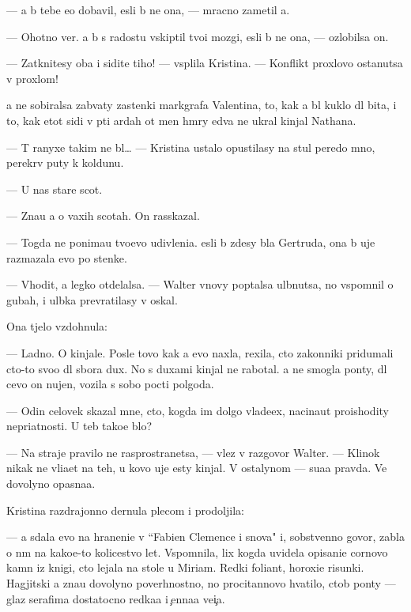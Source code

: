 \documentclass[10pt]{book}
\begin{document}
— {\Y}a b{\yi} tebe {\y}e{\x}o dobavil, {\y}esli b{\yi} ne ona, — mracno zametil {\y}a.

— Ohotno ver{\io}. {\Y}a b{\yi} s radost{\y}u vskip{\ia}til tvo{\y}i mozgi, {\y}esli b{\yi} ne ona, — ozlobilsa on.

— Zatknitesy oba i sidite tiho! — vsp{\yi}lila Kristina. — Konflikt{\yi} proxlovo ostanutsa v proxlom!

{\Y}a ne sobiralsa zab{\yi}vaty zastenki markgrafa Valentina, to, kak {\y}a b{\yi}l kuklo{\y} dl{\ia} bit{\y}a, i to, kak etot sid{\ia}{\x}i{\y} v p{\ia}ti {\y}ardah ot men{\ia} hm{\yi}ry {\y}edva ne ukral kinjal Nathana.

— T{\yi} ranyxe takim ne b{\yi}l… — Kristina ustalo opustilasy na stul peredo mno{\y}, perekr{\yi}v puty k koldunu.

— U nas star{\yi}{\y}e scot{\yi}.

— Zna{\y}u {\y}a o vaxih scotah. On rasskazal.

— Togda ne ponima{\y}u tvo{\y}evo udivleni{\y}a. {\Y}esli b{\yi} zdesy b{\yi}la Gertruda, ona b{\yi} uje razmazala {\y}evo po stenke.

— V{\yi}hodit, {\y}a legko otdelalsa. — Walter vnovy pop{\yi}talsa ul{\yi}bnutsa, no vspomnil o gubah, i ul{\yi}bka prevratilasy v oskal.

Ona t{\ia}jelo vzdohnula:

— Ladno. O kinjale. Posle tovo kak {\y}a {\y}evo naxla, rexila, cto zakonniki pridumali cto-to svo{\y}o dl{\ia} sbo\-ra dux. No s duxami kinjal ne ra\-bo\-tal. {\Y}a ne smogla pon{\ia}ty, dl{\ia} cevo on nujen, vozila s sobo{\y} pocti polgoda.

— Odin celovek skazal mne, cto, kogda im dolgo vlade{\y}ex, nacina{\y}ut proishodity nepri\-{\y}at\-nosti. U teb{\ia} tako{\y}e b{\yi}lo?

— Na straje{\y} pravilo ne rasprostran{\ia}{\y}etsa, — vlez v razgovor Walter. — Klinok nikak ne vli{\y}a{\y}et na teh, u kovo uje {\y}esty kinjal{\yi}. V ostalynom — su{\x}a{\y}a pravda. Ve{\x} dovolyno opasna{\y}a.

Kristina razdrajonno dernula plecom i prodoljila:

— {\Y}a sdala {\y}evo na hraneni{\y}e v ``Fabien Clemence i s{\yi}nov{\y}a" i, sobstvenno go\-vo\-r{\ia}, zab{\yi}la o n{\e}m na kako{\y}e-to kolicestvo let. Vspomnila, lix kogda uvidela opisani{\y}e cornovo kamn{\ia} iz knigi, cto lejala na stole u Mi\-ri\-am. Redki{\y} foliant, horoxi{\y}e risunki. Hagjitski{\y} {\y}a zna{\y}u dovolyno poverhnostno, no procitannovo hvatilo, ctob{\yi} pon{\ia}ty — glaz serafima dostatocno redka{\y}a i {\c}enna{\y}a ve{\x}i{\c}a.
\end{document}
